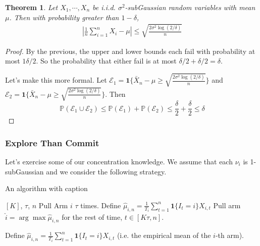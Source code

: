 \documentclass[11pt]{article}
\newtheorem{theorem}{Theorem}
\renewcommand{\P}{\mathbb{P}}
\newcommand{\1}{\mathbf{1}}
\begin{document}
\begin{theorem}
Let $X_1, \cdots, X_n$ be i.i.d. $\sigma^2$-subGaussian random variables with mean $\mu$. Then with probability greater than $1-\delta$,
\begin{align}
\left|\frac{1}{n}\sum_{i=1}^n X_i - \mu\right| \leq \sqrt{\frac{2\sigma^2\log(2/\delta)}{n}}
\end{align}
\end{theorem}
\begin{proof}
     By the previous, the upper and lower bounds each fail with probability at most $1\delta/2$. So the probability that either fail is at most $\delta/2 + \delta/2 = \delta$.

    Let's make this more formal. Let $\mathcal{E}_1 = \1\{\bar{X}_n - \mu \geq \sqrt{\frac{2\sigma^2\log(2/\delta)}{n}}\}$ and $\mathcal{E}_2 = \1\{\bar{X}_n - \mu \geq \sqrt{\frac{2\sigma^2\log(2/\delta)}{n}}\}$. Then \[\P(\mathcal{E}_1\cup\mathcal{E}_2) \leq \P(\mathcal{E}_1) + \P(\mathcal{E}_2) \leq \frac{\delta}{2} + \frac{\delta}{2} \leq \delta\]
\end{proof}    

\subsubsection{Explore Than Commit}

Let's exercise some of our concentration knowledge. We assume that each $\nu_i$ is 1-subGaussian and we consider the following strategy.
\begin{algorithm}
\caption{An algorithm with caption}\label{alg:cap}
\begin{algorithmic}
\State $[K]$, $\tau$, $n$
    \State Pull Arm $i$ $\tau$ times. 
\EndFor
\State Define $\hat{\mu}_{i,n} = \frac{1}{T_i} \sum_{t=1}^n \1\{I_t = i\} X_{i,t}$
\State Pull arm $\hat{i} = \arg\max \hat{\mu}_{i,n}$ for the rest of time, $t\in [K\tau,n]$.
\end{algorithmic}
\end{algorithm}

Define $\hat{\mu}_{i,n} = \frac{1}{T_i} \sum_{t=1}^n \1\{I_t = i\} X_{i,t}$ (i.e. the empirical mean of the $i$-th arm). 
\end{document}
